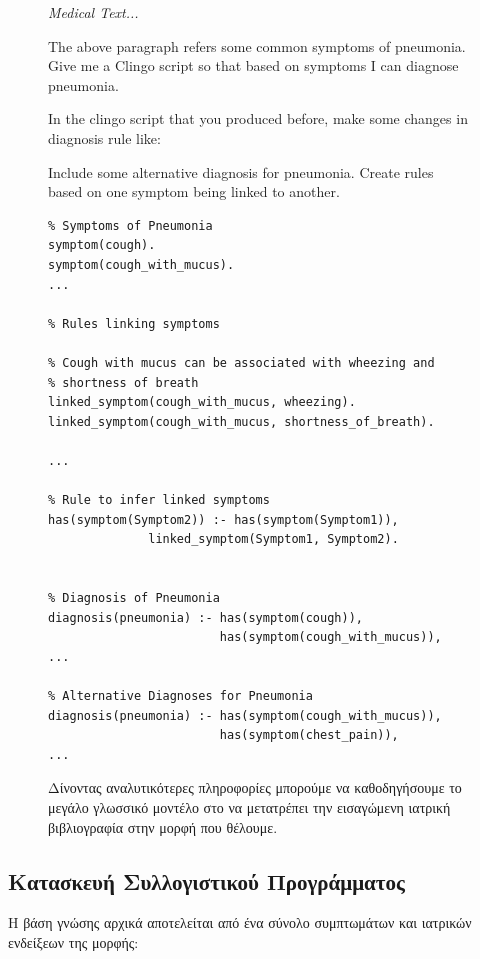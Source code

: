 \documentclass[12pt]{extarticle}
\begin{document}
\begin{figure}[!h]
\begin{prompt}
\textit{Medical Text...}

The above paragraph refers some common symptoms of pneumonia.
Give me a Clingo script so that based on symptoms I can diagnose pneumonia.

In the clingo script that you produced before, make some changes in diagnosis rule like:

Include some alternative diagnosis for pneumonia.
Create rules based on one symptom being linked to another.
\end{prompt}


\begin{commandline}
\scriptsize
\begin{verbatim}
% Symptoms of Pneumonia
symptom(cough).
symptom(cough_with_mucus).
...

% Rules linking symptoms

% Cough with mucus can be associated with wheezing and 
% shortness of breath
linked_symptom(cough_with_mucus, wheezing).
linked_symptom(cough_with_mucus, shortness_of_breath).

...

% Rule to infer linked symptoms
has(symptom(Symptom2)) :- has(symptom(Symptom1)), 
              linked_symptom(Symptom1, Symptom2).


% Diagnosis of Pneumonia
diagnosis(pneumonia) :- has(symptom(cough)),
                        has(symptom(cough_with_mucus)),
...

% Alternative Diagnoses for Pneumonia
diagnosis(pneumonia) :- has(symptom(cough_with_mucus)),
                        has(symptom(chest_pain)),
...
\end{verbatim}
\end{commandline}
\caption{Δίνοντας αναλυτικότερες πληροφορίες μπορούμε να καθοδηγήσουμε το μεγάλο γλωσσικό μοντέλο στο να μετατρέπει την εισαγώμενη ιατρική βιβλιογραφία στην μορφή που θέλουμε.}
\label{fig:good-prompt}
\end{figure}

\subsection{Κατασκευή Συλλογιστικού Προγράμματος}

Η βάση γνώσης αρχικά αποτελείται από ένα σύνολο συμπτωμάτων και ιατρικών ενδείξεων της μορφής: 
\end{document}
